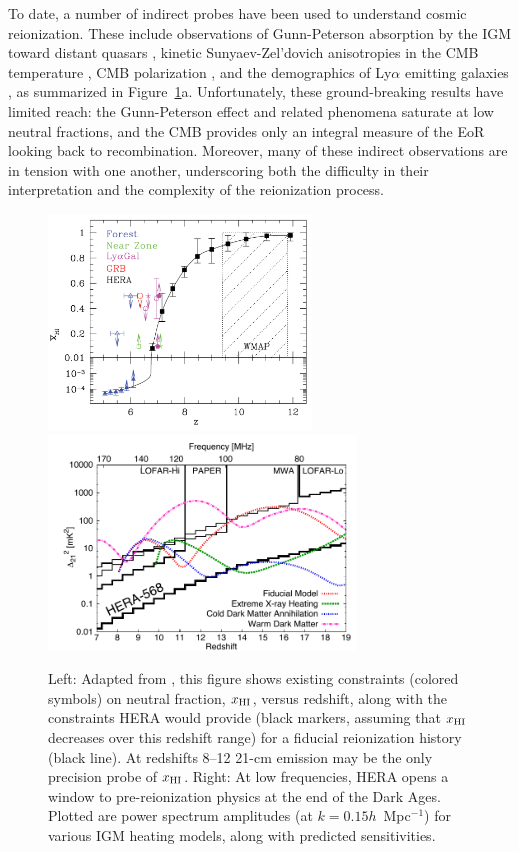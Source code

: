 \documentclass[preprint]{aastex}
\def\HI{{H{\small I }}}
\def\xHI{{x_{\rm\HI}}}
\begin{document}
To date, a number of indirect probes have been used to understand cosmic
reionization.  These include observations of Gunn-Peterson absorption by the
IGM toward distant quasars \citep{fan_et_al2006},
kinetic Sunyaev-Zel'dovich anisotropies in the CMB temperature \citep{zahn_et_al2012_trunc}, CMB
polarization \citep{page_et_al2007,planck_et_al2013}, and the
demographics of Ly$\alpha$ emitting galaxies
\citep{treu_et_al2013}, as summarized in Figure~\ref{fig:x_i_Xray}a.  Unfortunately,
these ground-breaking results have limited reach: the
Gunn-Peterson effect and related phenomena saturate at low neutral fractions,
and the CMB provides only an integral measure of %
the EoR looking 
back to recombination.  Moreover, many of these indirect observations are in
tension with one another, underscoring both the difficulty in their interpretation
and the complexity of the reionization process.


\begin{figure}[t]\centering
\includegraphics[height=2.25in]{plots/constraints.pdf}
\includegraphics[height=2.25in]{plots/Xray.pdf} 
\caption{\small 
Left: Adapted from \citet{robertson_2013}, this figure shows existing
constraints (colored symbols) on neutral fraction, $\xHI$, versus redshift, along with 
the constraints HERA would provide (black markers, assuming
that $\xHI$ decreases over this redshift range) for a fiducial
reionization history (black line).
At redshifts 8--12
21-cm emission may be the only precision probe of $\xHI$.
Right: At low frequencies, HERA opens a window to
pre-reionization physics at the end of the Dark Ages. Plotted are power spectrum amplitudes (at $k =
0.15h$~Mpc$^{-1}$) for various IGM heating models,
along with predicted sensitivities.
}\label{fig:x_i_Xray} \end{figure}
\end{document}
